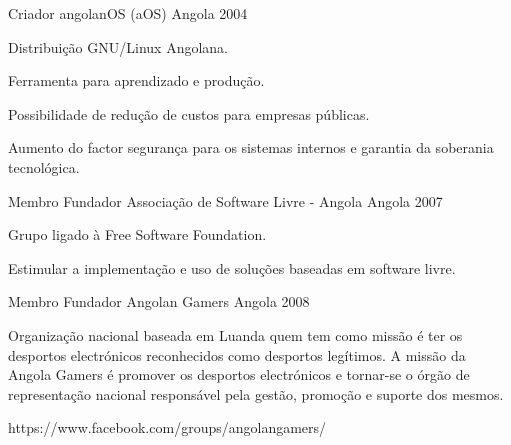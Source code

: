 


\begin{cventries}


\cventry
{Criador} %
{angolanOS (aOS)} %
{Angola} %
{2004} %
{ %
\begin{cvitems}
\item {Distribuição GNU/Linux Angolana.}
\item {Ferramenta para aprendizado e produção.}
\item {Possibilidade de redução de custos para empresas públicas.}
\item {Aumento do factor segurança para os sistemas internos e garantia da soberania tecnológica.}
\end{cvitems}
}



\cventry
{Membro Fundador} %
{Associação de Software Livre - Angola} %
{Angola} %
{2007} %
{ %
\begin{cvitems}
\item {Grupo ligado à Free Software Foundation.}
\item {Estimular a implementação e uso de soluções baseadas em software livre.}
\end{cvitems}
}


\cventry
{Membro Fundador} %
{Angolan Gamers} %
{Angola} %
{2008} %
{ %
\begin{cvitems}
\item {Organização nacional baseada em Luanda quem tem como missão é ter os desportos electrónicos reconhecidos como desportos legítimos. A missão da Angola Gamers é promover os desportos electrónicos e tornar-se o órgão de representação nacional responsável pela gestão, promoção e suporte dos mesmos.}
\item {https://www.facebook.com/groups/angolangamers/}
\end{cvitems}
}


\end{cventries}
